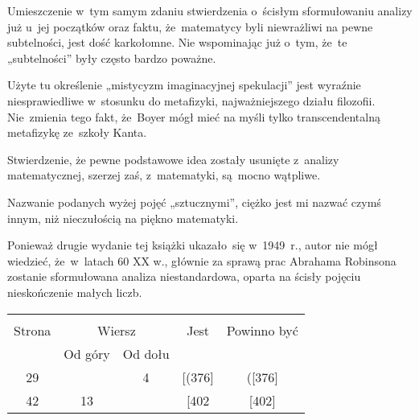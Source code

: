 \documentclass[a4paper,11pt]{article}
\begin{document}
\vspace{\spaceThree}







\start {} Umieszczenie w~tym samym zdaniu stwierdzenia
o~ścisłym sformułowaniu analizy już u~jej początków oraz faktu,
że~matematycy byli niewrażliwi na pewne subtelności, jest dość
karkołomne. Nie wspominając już o~tym, że~te „subtelności” były
często bardzo poważne.

\vspace{\spaceFour}



\start {} Użyte tu określenie „mistycyzm imaginacyjnej
spekulacji” jest wyraźnie niesprawiedliwe w~stosunku do metafizyki,
najważniejszego działu filozofii. Nie~zmienia tego fakt, że~Boyer mógł
mieć na myśli tylko transcendentalną metafizykę ze~szkoły Kanta.

\vspace{\spaceFour}



\start {} Stwierdzenie, że pewne podstawowe idea zostały
usunięte z~analizy matematycznej, szerzej zaś, z~matematyki, są~mocno
wątpliwe.

\vspace{\spaceFour}



\start {} Nazwanie podanych wyżej pojęć „sztucznymi”,
ciężko jest mi nazwać czymś innym, niż nieczułością na piękno
matematyki.

\vspace{\spaceFour}



\start {} Ponieważ drugie wydanie tej książki ukazało~się w~1949~r.,
autor nie mógł wiedzieć, że~w~latach 60 XX w., głównie za sprawą
prac Abrahama Robinsona zostanie sformułowana analiza niestandardowa,
oparta na ścisły pojęciu nieskończenie małych liczb.







\begin{center}

  \begin{tabular}{|c|c|c|c|c|}
    \hline
    & \multicolumn{2}{c|}{} & & \\
    Strona & \multicolumn{2}{c|}{Wiersz} & Jest
                              & Powinno być \\ \cline{2-3}
    & Od góry & Od dołu & & \\
    \hline
    29  & &  4 & [(376] & ([376] \\
    42  & 13 & & [402 & [402] \\
    \hline
  \end{tabular}

\end{center}
\end{document}
